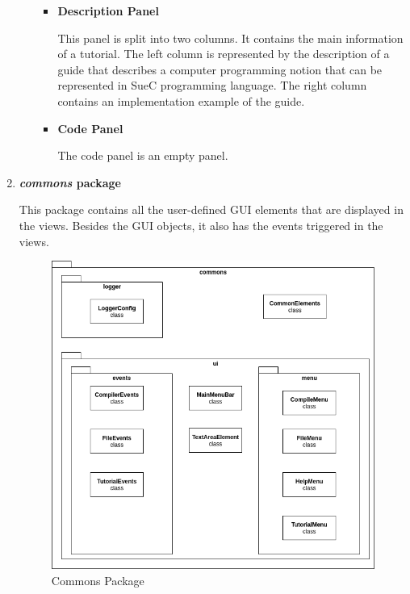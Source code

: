 \documentclass[12pt,a4paper,twoside]{report}
\begin{document}
\begin{enumerate}
\begin{enumerate}
\begin{itemize}
 \item \textbf{Description Panel}
 
 This panel is split into two columns. It contains the main information of a tutorial. The left column is represented by the description of a guide that describes a computer programming notion that can be represented in SueC programming language. The right column contains an implementation example of the guide.
 
 \item \textbf{Code Panel}
 
 The code panel is an empty panel.  
 \end{itemize}


\end{enumerate}



\item \textbf{\textit{commons} package}

This package contains all the user-defined GUI elements that are displayed in the views. Besides the GUI objects, it also has the events triggered in the views. 

\begin{figure}[H]
    \centering
    \includegraphics[width=1\linewidth]{img/diags/CommonsPackage.png}
    \caption{Commons Package}
    \label{fig:conf}
\end{figure}


\end{enumerate}
\end{document}
